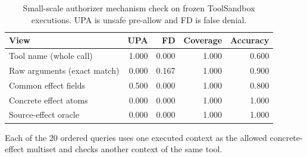\begin{table}[t]
\centering
\small
\caption{Small-scale authorizer mechanism check on frozen ToolSandbox executions. UPA is unsafe pre-allow and FD is false denial.}
\label{tab:concrete-atom-authorizer}
\begin{tabular}{lrrrr}
\toprule
View & UPA & FD & Coverage & Accuracy \\
\midrule
Tool name (whole call) & 1.000 & 0.000 & 1.000 & 0.600 \\
Raw arguments (exact match) & 0.000 & 0.167 & 1.000 & 0.900 \\
Common effect fields & 0.500 & 0.000 & 1.000 & 0.800 \\
Concrete effect atoms & 0.000 & 0.000 & 1.000 & 1.000 \\
Source-effect oracle & 0.000 & 0.000 & 1.000 & 1.000 \\
\bottomrule
\end{tabular}
\vspace{2pt}\parbox{0.98\linewidth}{\footnotesize Each of the 20 ordered queries uses one executed context as the allowed concrete-effect multiset and checks another context of the same tool.}
\end{table}
